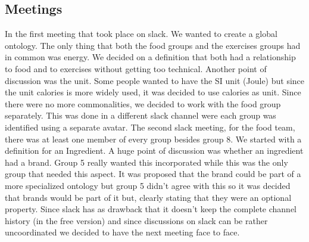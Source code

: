 \subsection{Meetings}

In the first meeting that took place on slack. We wanted to create a global ontology. The only thing that both the food groups and the exercises groups had in common was energy. We decided on a definition that both had a relationship to food and to exercises without getting too technical. Another point of discussion was the unit. Some people wanted to have the SI unit (Joule) but since the unit calories is more widely used, it was decided to use calories as unit. Since there were no more commonalities, we decided to work with the food group separately. This was done in a different slack channel were each group was identified using a separate avatar. 
\newline
\newline
\noindent
The second slack meeting, for the food team, there was at least one member of every group besides group 8. We started with a definition for an Ingredient. A huge point of discussion was whether an ingredient had a brand. Group 5 really wanted this incorporated while this was the only group that needed this aspect. It was proposed that the brand could be part of a more specialized ontology but group 5 didn't agree with this so it was decided that brands would be part of it but, clearly stating that they were an optional property. Since slack has as drawback that it doesn't keep the complete channel history (in the free version) and since discussions on slack can be rather uncoordinated we decided to have the next meeting face to face. 
\newline
\newline
\noindent
